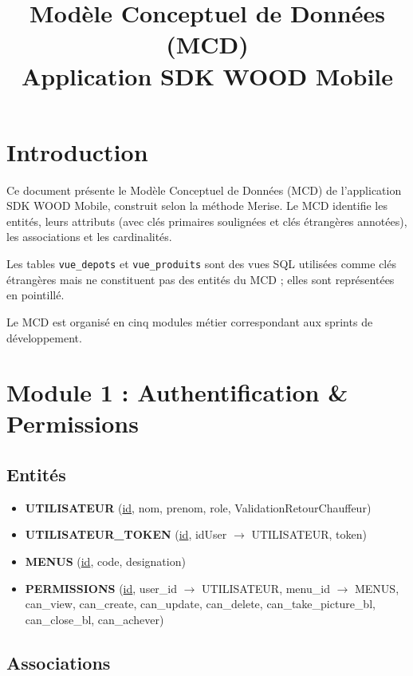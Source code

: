 \documentclass[12pt,a4paper]{article}
\title{\textbf{Modèle Conceptuel de Données (MCD)\\[0.3em]
\large Application SDK WOOD Mobile}}
\author{}
\date{}
\begin{document}
\maketitle
\thispagestyle{empty}

\section{Introduction}

Ce document présente le Modèle Conceptuel de Données (MCD) de l'application SDK WOOD Mobile, construit selon la méthode Merise. Le MCD identifie les entités, leurs attributs (avec clés primaires soulignées et clés étrangères annotées), les associations et les cardinalités.

Les tables \texttt{vue\_depots} et \texttt{vue\_produits} sont des vues SQL utilisées comme clés étrangères mais ne constituent pas des entités du MCD ; elles sont représentées en pointillé.

Le MCD est organisé en cinq modules métier correspondant aux sprints de développement.

\tableofcontents
\newpage

\section{Module 1 : Authentification \& Permissions}

\subsection{Entités}

\begin{itemize}[leftmargin=1.5em]
\item \textbf{UTILISATEUR} (\underline{id}, nom, prenom, role, ValidationRetourChauffeur)
\item \textbf{UTILISATEUR\_TOKEN} (\underline{id}, idUser $\rightarrow$ UTILISATEUR, token)
\item \textbf{MENUS} (\underline{id}, code, designation)
\item \textbf{PERMISSIONS} (\underline{id}, user\_id $\rightarrow$ UTILISATEUR, menu\_id $\rightarrow$ MENUS, can\_view, can\_create, can\_update, can\_delete, can\_take\_picture\_bl, can\_close\_bl, can\_achever)
\end{itemize}

\subsection{Associations}
\end{document}
